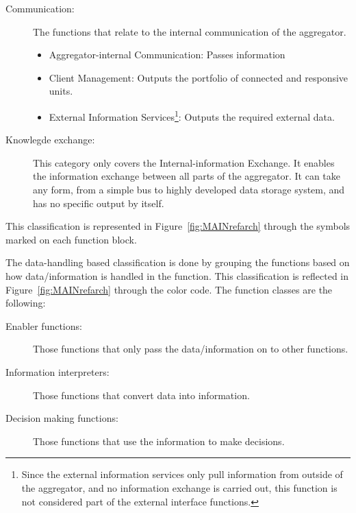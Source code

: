 \begin{description}
\begin{itemize}
		\end{itemize}
	\item[Communication:] The functions that relate to the internal communication of the aggregator.
		\begin{itemize}
			\item Aggregator-internal Communication: Passes information
			\item Client Management: Outputs the portfolio of connected and responsive units.
			\item External Information Services\footnote{Since the external information services only pull information from outside of the aggregator, and no information exchange is carried out, this function is not considered part of the external interface functions.}: Outputs the required external data.
		\end{itemize}
	\item[Knowlegde exchange:] This category only covers the Internal-information Exchange. It enables the information exchange between all parts of the aggregator. It can take any form, from a simple bus to highly developed data storage system, and has no specific output by itself.
\end{description}
This classification is represented in Figure~\ref{fig:MAINrefarch} through the symbols marked on each function block.

The data-handling based classification is done by grouping the functions based on how data/information is handled in the function. This classification is reflected in Figure~\ref{fig:MAINrefarch} through the color code. The function classes are the following:
\begin{description}
	\item[Enabler functions:] Those functions that only pass the data/information on to other functions.
	\item[Information interpreters:] Those functions that convert data into information.
	\item[Decision making functions:] Those functions that use the information to make decisions.
\end{description}

